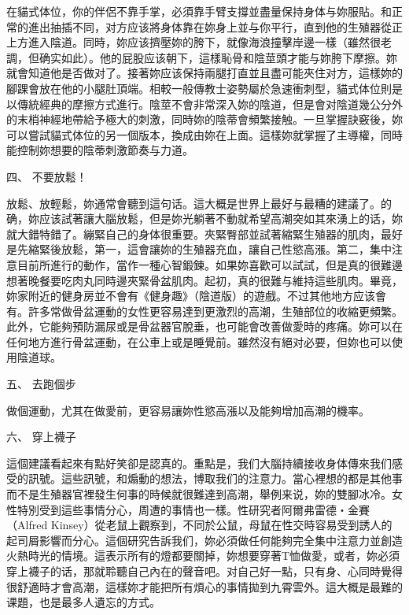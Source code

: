 \documentclass[12pt,UTF8]{ctexbook}
\begin{document}
在貓式体位，你的伴侶不靠手掌，必須靠手臂支撐並盡量保持身体与妳服貼。和正常的進出抽插不同，对方应该將身体靠在妳身上並与你平行，直到他的生殖器從正上方進入陰道。同時，妳应该擠壓妳的胯下，就像海浪撞擊岸邊一樣（雖然很老調，但确实如此）。他的屁股应该朝下，這樣恥骨和陰莖頭才能与妳胯下摩擦。妳就會知道他是否做对了。接著妳应该保持兩腿打直並且盡可能夾住对方，這樣妳的腳踝會放在他的小腿肚頂端。相較一般傳教士姿勢屬於急速衝刺型，貓式体位則是以傳統經典的摩擦方式進行。陰莖不會非常深入妳的陰道，但是會对陰道幾公分外的末梢神經地帶給予極大的刺激，同時妳的陰蒂會頻繁接触。一旦掌握訣竅後，妳可以嘗試貓式体位的另一個版本，換成由妳在上面。這樣妳就掌握了主導權，同時能控制妳想要的陰蒂刺激節奏与力道。



四、 不要放鬆！

放鬆、放輕鬆，妳通常會聽到這句话。這大概是世界上最好与最糟的建議了。的确，妳应该試著讓大腦放鬆，但是妳光躺著不動就希望高潮突如其來湧上的话，妳就大錯特錯了。繃緊自己的身体很重要。夾緊臀部並試著縮緊生殖器的肌肉，最好是先縮緊後放鬆，第一，這會讓妳的生殖器充血，讓自己性慾高漲。第二，集中注意目前所進行的動作，當作一種心智鍛鍊。如果妳喜歡可以試試，但是真的很難邊想著晚餐要吃肉丸同時邊夾緊骨盆肌肉。起初，真的很難与維持這些肌肉。畢竟，妳家附近的健身房並不會有《健身趣》（陰道版）的遊戲。不过其他地方应该會有。許多常做骨盆運動的女性更容易達到更激烈的高潮，生殖部位的收縮更頻繁。此外，它能夠預防漏尿或是骨盆器官脫垂，也可能會改善做愛時的疼痛。妳可以在任何地方進行骨盆運動，在公車上或是睡覺前。雖然沒有絕对必要，但妳也可以使用陰道球。



五、 去跑個步

做個運動，尤其在做愛前，更容易讓妳性慾高漲以及能夠增加高潮的機率。



六、 穿上襪子

這個建議看起來有點好笑卻是認真的。重點是，我们大腦持續接收身体傳來我们感受的訊號。這些訊號，和煽動的想法，博取我们的注意力。當心裡想的都是其他事而不是生殖器官裡發生何事的時候就很難達到高潮，舉例来说，妳的雙腳冰冷。女性特別受到這些事情分心，周遭的事情也一樣。性研究者阿爾弗雷德‧金賽（Alfred Kinsey）從老鼠上觀察到，不同於公鼠，母鼠在性交時容易受到誘人的起司屑影響而分心。這個研究告訴我们，妳必須做任何能夠完全集中注意力並創造火熱時光的情境。這表示所有的燈都要關掉，妳想要穿著T恤做愛，或者，妳必須穿上襪子的话，那就聆聽自己內在的聲音吧。对自己好一點，只有身、心同時覺得很舒適時才會高潮，這樣妳才能把所有煩心的事情拋到九霄雲外。這大概是最難的课題，也是最多人遺忘的方式。
\end{document}
